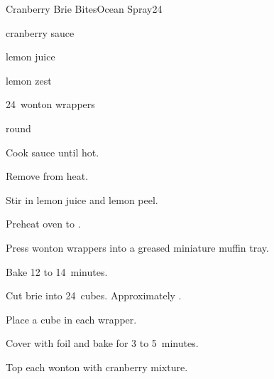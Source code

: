 \begin{recipe}{Cranberry Brie Bites}{Ocean Spray}{24}

\begin{ingredients}
\item \C{\threequarter} cranberry sauce
\item {} lemon juice
\item \tp{\half} lemon zest
\item 24~wonton wrappers
\item {}  round
\end{ingredients}

\begin{directions}
\item Cook sauce until hot.
\item Remove from heat.
\item Stir in lemon juice and lemon peel.
\item Preheat oven to .
\item Press wonton wrappers into a greased miniature muffin tray.
\item Bake 12 to 14~minutes.
\item Cut brie into 24~cubes. Approximately \inch{\threequarter}.
\item Place a cube in each wrapper.
\item Cover with foil and bake for 3 to 5~minutes.
\item Top each wonton with  cranberry mixture.
\end{directions}

\end{recipe}
